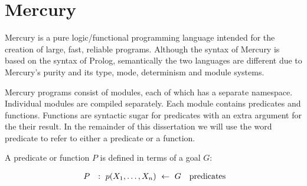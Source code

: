 
\section{Mercury}
\label{sec:backgnd_mercury}

Mercury is a pure logic/functional programming language
intended for the creation of large, fast, reliable programs.
Although the syntax of Mercury is based on the syntax of Prolog,
semantically the two languages are different
due to Mercury's purity and its type, mode, determinism and module systems.

Mercury programs consist of modules,
each of which has a separate namespace.
Individual modules are compiled separately.
Each module contains predicates and functions.
Functions are syntactic sugar for predicates with an extra argument for the
their result.
In the remainder of this dissertation we will use the word predicate to
refer to either a predicate or a function.

A predicate or function $P$ is defined in terms of a goal $G$:

$$
\begin{array}{lll}
~P
    & :~ p(X_1, \ldots, X_n)~\leftarrow~G
        & \hbox{predicates} \\
\end{array}
$$


